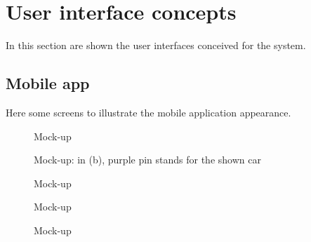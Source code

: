 \documentclass{scrreprt}
\begin{document}
\section{User interface concepts}
In this section are shown the user interfaces conceived for the system.

\subsection{Mobile app}
Here some screens to illustrate the mobile application appearance.

\begin{figure}[htb]
\centering
{} \quad
{}
\caption{Mock-up }
\label{fig:reglogMU}
\end{figure}


\begin{figure}[htb]
\centering
{} \quad
{}
\caption{Mock-up: in (b), purple pin stands for the shown car}
\label{fig:searchCarMU}
\end{figure}

\begin{figure}[htb]
\centering
{} \quad
{}
\caption{Mock-up }
\label{fig:chresMU}
\end{figure}

\begin{figure}[htb]
\centering
{} \quad
{}
\caption{Mock-up }
\label{fig:unlockMU}
\end{figure}

\begin{figure}[htb]
\centering
{} \quad
{}
\caption{Mock-up }
\label{fig:statusMU}
\end{figure}
\end{document}
